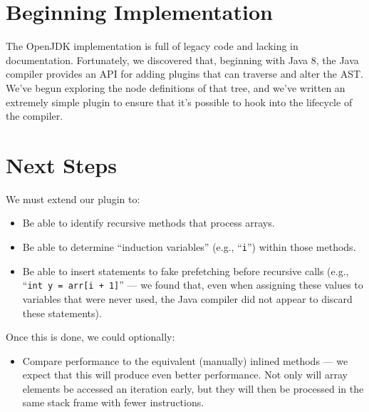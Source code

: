 \documentclass[journal,onecolumn]{IEEEtran}
\begin{document}
\section{Beginning Implementation}

The OpenJDK implementation is full of legacy code and lacking in documentation. Fortunately, we discovered that, beginning with Java 8, the Java compiler provides an API for adding plugins that can traverse and alter the AST. We've begun exploring the node definitions of that tree, and we've written an extremely simple plugin to ensure that it's possible to hook into the lifecycle of the compiler.


\section{Next Steps}

We must extend our plugin to:
\begin{itemize}[topsep=0em]
    \item Be able to identify recursive methods that process arrays.
    \item Be able to determine ``induction variables'' (e.g., ``\texttt{i}'') within those methods.
    \item Be able to insert statements to fake prefetching before recursive calls (e.g., ``\texttt{int y = arr[i + 1]}'' --- we found that, even when assigning these values to variables that were never used, the Java compiler did not appear to discard these statements).
\end{itemize}

Once this is done, we could optionally:
\begin{itemize}[topsep=0em]
    \item Compare performance to the equivalent (manually) inlined methods --- we expect that this will produce even better performance. Not only will array elements be accessed an iteration early, but they will then be processed in the same stack frame with fewer instructions.
\end{itemize}
\end{document}
